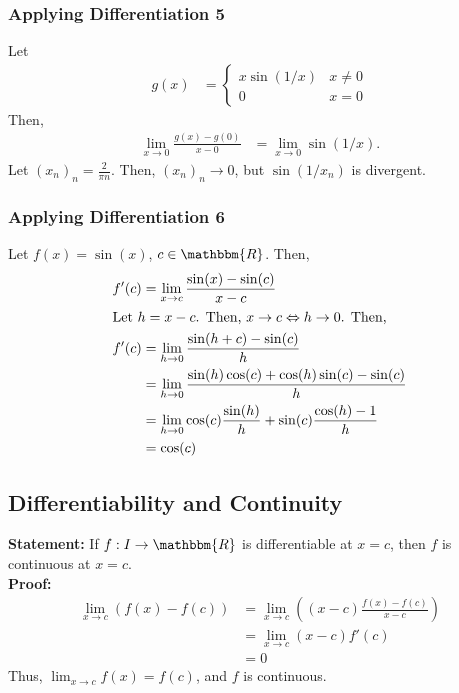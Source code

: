 \documentclass[10pt]{extarticle}
\newcommand{\R}{\mathbbm{R}}
\begin{document}
  \subsubsection{Applying Differentiation 5}%
    Let
    \begin{align*}
      g(x) &= \begin{cases}
        x\sin(1/x) & x\neq 0\\
        0 & x=0
      \end{cases}
    \end{align*}
    Then,
    \begin{align*}
      \lim_{x\rightarrow 0} \frac{g(x) - g(0)}{x-0} &= \lim_{x\rightarrow 0}\sin(1/x).
    \end{align*}
    Let $(x_n)_n = \frac{2}{\pi n}$. Then, $(x_n)_n \rightarrow 0$, but $\sin(1/x_n)$ is divergent.
  \subsubsection{Applying Differentiation 6}%
    Let $f(x) = \sin(x)$, $c\in\R$. Then,
    \begin{align*}
      f'(c) &= \lim_{x\rightarrow c} \frac{\sin(x) - \sin(c)}{x-c}\\
      \shortintertext{Let $h = x-c$. Then, $x\rightarrow c \Leftrightarrow h\rightarrow 0$. Then,}
      f'(c) &= \lim_{h\rightarrow 0}\frac{\sin(h+c) - \sin(c)}{h}\\
            &= \lim_{h\rightarrow 0}\frac{\sin(h)\cos(c) + \cos(h)\sin(c) - \sin(c)}{h}\\
            &= \lim_{h\rightarrow 0}\cos(c)\frac{\sin(h)}{h} + \sin(c)\frac{\cos(h) - 1}{h}\\
            &= \cos(c)
    \end{align*}
  \subsection{Differentiability and Continuity}%
    \textbf{Statement:} If $f: I\rightarrow \R$ is differentiable at $x=c$, then $f$ is continuous at $x=c$.\\

    \textbf{Proof:}
    \begin{align*}
      \lim_{x\rightarrow c}\left(f(x) - f(c)\right) &= \lim_{x\rightarrow c}\left(\left(x-c\right)\frac{f(x) - f(c)}{x-c}\right)\\
                                                    &= \lim_{x\rightarrow c}(x-c)f'(c)\\
                                                    &= 0
    \end{align*}
    Thus, $\lim_{x\rightarrow c}f(x) = f(c)$, and $f$ is continuous.
\end{document}
